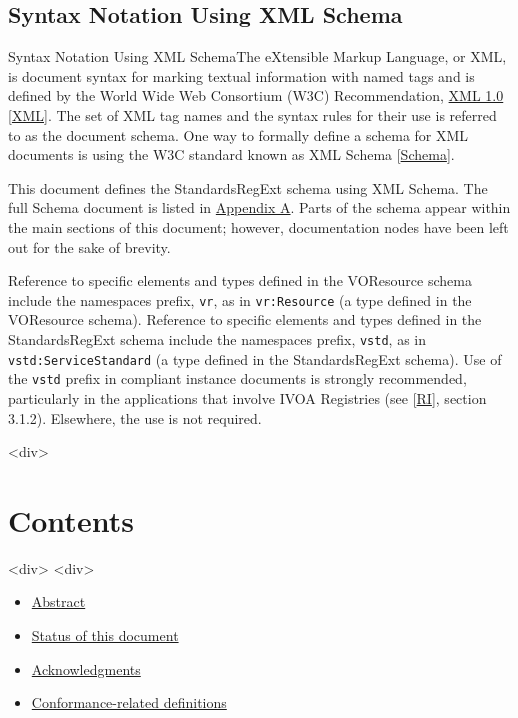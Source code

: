 \documentclass[11pt,a4paper]{ivoa}
\begin{document}
{{\subsection{Syntax Notation Using XML Schema}
Syntax Notation Using XML SchemaThe eXtensible Markup Language, or XML, is document syntax for marking
textual information with named tags and is defined by the
World Wide Web Consortium (W3C) Recommendation,
\href{http://www.w3.org/TR/REC-xml}{XML 1.0}
[\href{#xml}{XML}].  The set of XML tag names and the syntax
rules for their use is referred to as the document schema.  One way to
formally define a schema for XML documents is using the W3C standard
known as XML Schema [\href{#schema}{Schema}].


This document defines the StandardsRegExt schema using XML Schema.  The
full Schema document is listed in \href{#appA}{Appendix A}.
Parts of the schema appear within the main sections of this document;
however, documentation nodes have been left out for the sake of brevity.  



Reference to specific elements and types defined in the VOResource
schema include the namespaces prefix, \texttt{vr}, as in
\texttt{vr:Resource} (a type defined in the VOResource schema).
Reference to specific elements and types defined in the StandardsRegExt
schema include the namespaces prefix, \texttt{vstd}, as in
\texttt{vstd:ServiceStandard} (a type defined in the StandardsRegExt schema).
Use of the \texttt{vstd} prefix in compliant instance documents is 
strongly recommended, particularly in the applications that involve
IVOA Registries (see [\href{#r:ri}{RI}], section 3.1.2).
Elsewhere, the use is not required.  



<div>
\section{Contents}

\label{contents}


<div>
<div>
\begin{itemize}

\item \href{#abstract}{Abstract}{}

\item \href{#status}{Status of this document}{}

\item \href{#acknowledge}{Acknowledgments}{}

\item \href{#conf}{Conformance-related definitions}{}


\end{itemize}}}
\end{document}
